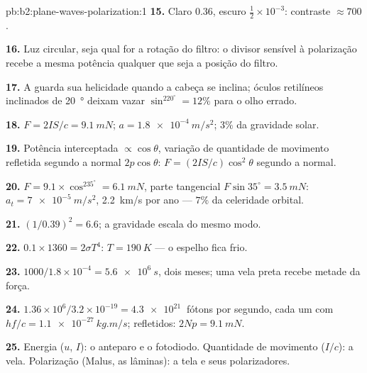 \begin{solution}{pb:b2:plane-waves-polarization:1}
\textbf{15.} Claro $0.36$, escuro $\tfrac12 \times 10^{-3}$: contraste $\approx 700$.

\textbf{16.} Luz circular, seja qual for a rotação do filtro: o
divisor sensível à polarização recebe a mesma potência qualquer que seja a
posição do filtro.

\textbf{17.} A  guarda sua helicidade quando a cabeça
se inclina; óculos retilíneos inclinados de \qty{20}{\degree} deixam vazar $\sin^220^\circ = 12\%$ para
o olho errado.

\textbf{18.} $F = 2IS/c = \qty{9.1}{mN}$; $a = \qty{1.8e-4}{m/s^2}$; $3\%$ da gravidade
solar.

\textbf{19.} Potência interceptada $\propto\cos\theta$, variação de quantidade de movimento refletida
segundo a normal $2p\cos\theta$: $F = (2IS/c)\cos^2\theta$ segundo a normal.

\textbf{20.} $F = 9.1 \times \cos^235^\circ = \qty{6.1}{mN}$, parte tangencial $F\sin35^\circ
= \qty{3.5}{mN}$: $a_t = \qty{7e-5}{m/s^2}$, \qty{2.2}{km/s} por ano --- $7\%$ da
celeridade orbital.

\textbf{21.} $(1/0.39)^2 = 6.6$; a gravidade escala do mesmo modo.

\textbf{22.} $0.1 \times 1360 = 2\sigma T^4$: $T = \qty{190}{K}$ --- o espelho fica
frio.

\textbf{23.} $1000/1.8 \times 10^{-4} = \qty{5.6e6}{s}$, dois meses; uma vela preta
recebe metade da força.

\textbf{24.} $1.36 \times 10^6/3.2 \times 10^{-19} = \qty{4.3e21}{}$ fótons por segundo,
cada um com $hf/c = \qty{1.1e-27}{kg.m/s}$; refletidos: $2Np = \qty{9.1}{mN}$.

\textbf{25.} Energia ($u$, $I$): o anteparo e o fotodiodo.
Quantidade de movimento ($I/c$): a vela. Polarização (Malus, as lâminas): a
tela e seus polarizadores.
\end{solution}
